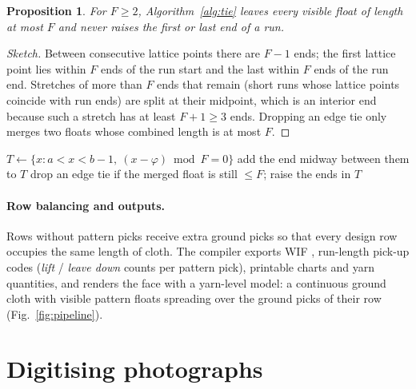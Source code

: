 \documentclass[11pt]{article}
\newtheorem{proposition}{Proposition}
\begin{document}
\begin{proposition}
For $F\ge 2$, Algorithm~\ref{alg:tie} leaves every visible float of length at most $F$ and never
raises the first or last end of a run.
\end{proposition}
\begin{proof}[Sketch]
Between consecutive lattice points there are $F-1$ ends; the first lattice point lies within $F$
ends of the run start and the last within $F$ ends of the run end. Stretches of more than $F$
ends that remain (short runs whose lattice points coincide with run ends) are split at their
midpoint, which is an interior end because such a stretch has at least $F+1\ge 3$ ends. Dropping an
edge tie only merges two floats whose combined length is at most $F$.
\end{proof}

\begin{algorithm}[t]
\caption{Tie-down placement for one pattern pick}\label{alg:tie}
\begin{algorithmic}[1]
\For{each visible run $[a,b)$ with $b-a>F$}
  \State $T \gets \{x : a < x < b-1,\ (x-\varphi) \bmod F = 0\}$
    \State add the end midway between them to $T$
  \EndWhile
  \State drop an edge tie if the merged float is still $\le F$; raise the ends in $T$
\EndFor
\end{algorithmic}
\end{algorithm}

\paragraph{Row balancing and outputs.}
Rows without pattern picks receive extra ground picks so that every design row occupies the same
length of cloth. The compiler exports WIF \cite{wif1997}, run-length pick-up codes (\emph{lift} /
\emph{leave down} counts per pattern pick), printable charts and yarn quantities, and renders the face
with a yarn-level model: a continuous ground cloth with visible pattern floats spreading over the
ground picks of their row (Fig.~\ref{fig:pipeline}).

\section{Digitising photographs}
\label{sec:digitise}
\end{document}
